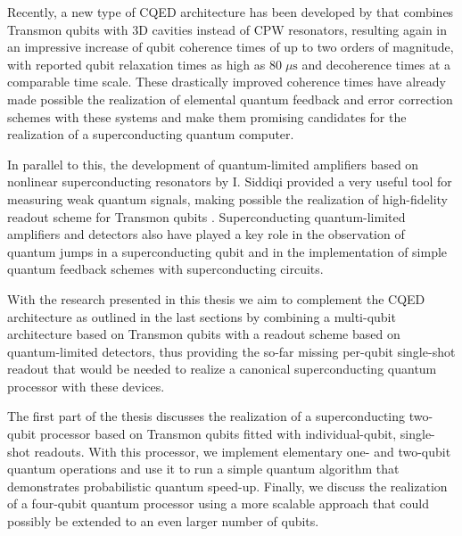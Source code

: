 Recently, a new type of CQED architecture has been developed by \cite{paik_observation_2011} that combines Transmon qubits with 3D cavities instead of CPW resonators, resulting again in an impressive increase of qubit coherence times of up to two orders of magnitude, with reported qubit relaxation times as high as $80 \; \mu \mathrm{s}$ and decoherence times at a comparable time scale. These drastically improved coherence times have already made possible the realization of elemental quantum feedback and error correction schemes with these systems  and make them promising candidates for the realization of a superconducting quantum computer.

In parallel to this, the development of quantum-limited amplifiers based on nonlinear superconducting resonators by I. Siddiqi \citep{siddiqi_rf-driven_2004,vijay_invited_2009} provided a very useful tool for measuring weak quantum signals, making possible the realization of high-fidelity readout scheme for Transmon qubits \citep{siddiqi_dispersive_2006,mallet_single-shot_2009}. Superconducting quantum-limited amplifiers and detectors also have played a key role in the observation of quantum jumps in a superconducting qubit \citep{vijay_observation_2011} and in the implementation of simple quantum feedback schemes with superconducting circuits.

\smallskip

With the research presented in this thesis we aim  to complement the CQED architecture as outlined in the last sections by combining a multi-qubit architecture based on Transmon qubits with a readout scheme based on quantum-limited detectors, thus providing the so-far missing per-qubit single-shot readout that would be needed to realize a canonical superconducting quantum processor with these devices.

The first part of the thesis discusses the realization of a superconducting two-qubit processor based on Transmon qubits fitted with individual-qubit, single-shot readouts. With this processor, we implement elementary one- and two-qubit quantum operations and use it to run a simple quantum algorithm that demonstrates probabilistic quantum speed-up. Finally, we discuss the realization of a four-qubit quantum processor using a more scalable approach that could possibly be extended to an even larger number of qubits.

